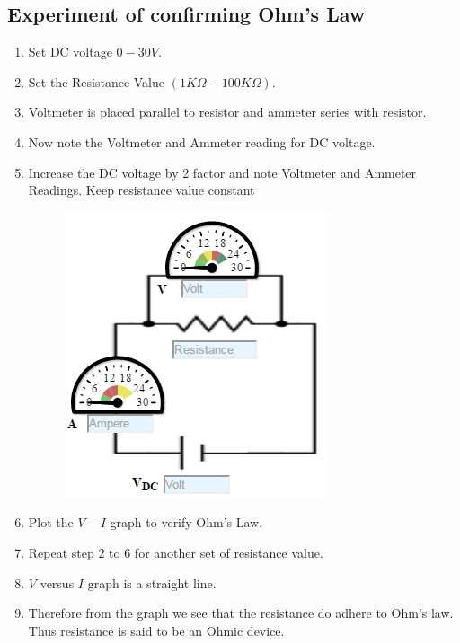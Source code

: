 		\subsection{Experiment of confirming Ohm's Law}			
			\begin{enumerate}
				\tightlist
				\item
				Set DC voltage $0-30V$.
				\item
				Set the Resistance Value $(1 K\Omega - 100 K\Omega)$.
				\item
				Voltmeter is placed parallel to resistor and ammeter series with
				resistor.
				\item
				Now note the Voltmeter and Ammeter reading for DC voltage.
				\item
				Increase the DC voltage by 2 factor and note Voltmeter and Ammeter
				Readings. Keep resistance value constant
				\begin{figure}[h]
					\centering
					\includegraphics[width=0.4\linewidth]{img/exp4/5}
					\caption{}
					\label{fig:exp4_1}
				\end{figure}
				\item
				Plot the $V-I$ graph to verify Ohm's Law.
				\item
				Repeat step 2 to 6 for another set of resistance value.
				\item
				$V$ versus $I$ graph is a straight line.
				\item
				Therefore from the graph we see that the resistance do adhere to Ohm's
				law. Thus resistance is said to be an Ohmic device.
			\end{enumerate}
		

